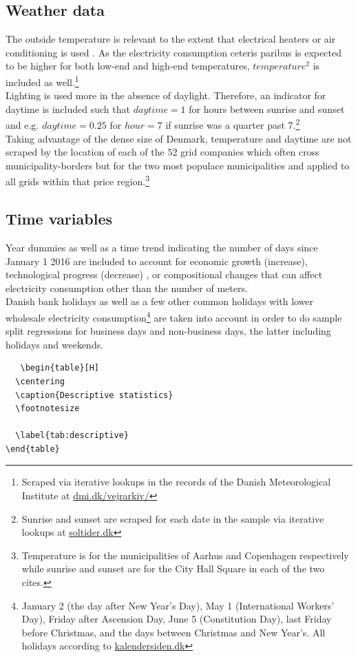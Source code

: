 \subsection{Weather data}
\label{subsec:d_weather}
The outside temperature is relevant to the extent that electrical heaters or air conditioning is used \citep{lijesen2007real, vesterberg2014residential}. As the electricity consumption ceteris paribus is expected to be higher for both low-end and high-end temperatures, $temperature^2$ is included as well.\footnote{Scraped via iterative lookups in the records of the Danish Meteorological Institute at \href{https://www.dmi.dk/vejrarkiv/}{dmi.dk/vejrarkiv/}}
\medskip\\
Lighting is used more in the absence of daylight. Therefore, an indicator for daytime is included such that $daytime=1$ for hours between sunrise and sunset and e.g. $daytime=0.25$ for $hour=7$ if sunrise was a quarter past 7.\footnote{Sunrise and sunset are scraped for each date in the sample via iterative lookups at \href{https://soltider.dk/}{soltider.dk}}
\medskip\\
Taking advantage of the dense size of Denmark, temperature and daytime are not scraped by the location of each of the 52 grid companies which often cross municipality-borders but for the two most populace municipalities and applied to all grids within that price region.\footnote{Temperature is for the municipalities of Aarhus and Copenhagen respectively while sunrise and sunset are for the City Hall Square in each of the two cites.}

\subsection{Time variables}
\label{subsec:d_time}
Year dummies as well as a time trend indicating the number of days since January 1 2016 are included to account for economic growth (increase), technological progress (decrease) \citep{lijesen2007real}, or compositional changes that can affect electricity consumption other than the number of meters.
\medskip\\
Danish bank holidays as well as a few other common holidays with lower wholesale electricity consumption\footnote{January 2 (the day after New Year's Day), May 1 (International Workers' Day), Friday after Ascension Day, June 5 (Constitution Day), last Friday before Christmas, and the days between Christmas and New Year's. All holidays according to \href{https://kalendersiden.dk/}{kalendersiden.dk}} are taken into account in order to do sample split regressions for business days and non-business days, the latter including holidays and weekends.
\begin{verbatim}
   \begin{table}[H]
  \centering
  \caption{Descriptive statistics}
  \footnotesize
    
  \label{tab:descriptive}
\end{table}  
\end{verbatim}

